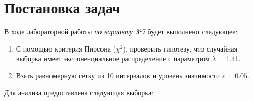 \section{Постановка задач}

В ходе лабораторной работы \textit{по варианту №7} будет выполнено следующее:

\begin{enumerate}
  \item С помощью критерия Пирсона ($\chi^2$), проверить гипотезу, что случайная выборка имеет экспоненциальное распределение с параметром $\lambda$ = 1.41.
  \item Взять равномерную сетку из 10 интервалов и уровень значимости $\varepsilon = 0.05$.
\end{enumerate}

Для анализа предоставлена следующая выборка:

